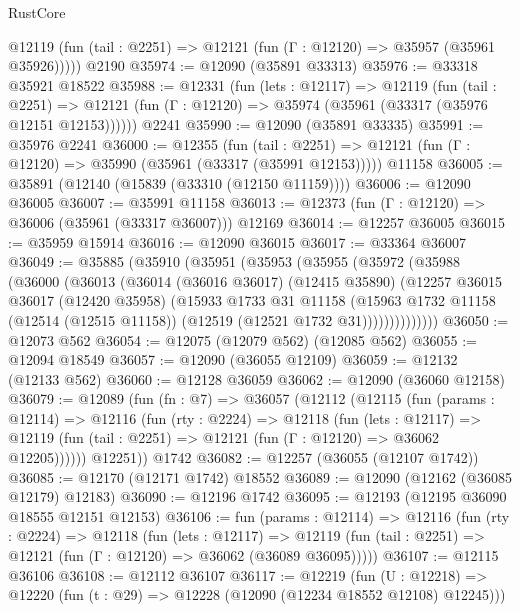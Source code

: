 \begin{lexlean}{RustCore}
\begin{coremodule}
      @12119 (fun (tail : @2251) => @12121 (fun (Γ : @12120) => @35957 (@35961 @35926)))))
    @2190
@35974 := @12090 (@35891 @33313)
@35976 := @33318 @35921 @18522
@35988 := @12331
    (fun (lets : @12117) =>
    @12119
      (fun (tail : @2251) =>
      @12121 (fun (Γ : @12120) => @35974 (@35961 (@33317 (@35976 @12151 @12153))))))
    @2241
@35990 := @12090 (@35891 @33335)
@35991 := @35976 @2241
@36000 := @12355
    (fun (tail : @2251) => @12121 (fun (Γ : @12120) => @35990 (@35961 (@33317 (@35991 @12153)))))
    @11158
@36005 := @35891 (@12140 (@15839 (@33310 (@12150 @11159))))
@36006 := @12090 @36005
@36007 := @35991 @11158
@36013 := @12373 (fun (Γ : @12120) => @36006 (@35961 (@33317 @36007))) @12169
@36014 := @12257 @36005
@36015 := @35959 @15914
@36016 := @12090 @36015
@36017 := @33364 @36007
@36049 := @35885
    (@35910
      (@35951
        (@35953
          (@35955
            (@35972
              (@35988
                (@36000
                  (@36013
                    (@36014
                      (@36016 @36017)
                      (@12415 @35890)
                      (@12257
                        @36015
                        @36017
                        (@12420 @35958)
                        (@15933
                          @1733
                          @31
                          @11158
                          (@15963
                            @1732
                            @11158
                            (@12514 (@12515 @11158))
                            (@12519 (@12521 @1732 @31))))))))))))))
@36050 := @12073 @562
@36054 := @12075 (@12079 @562) (@12085 @562)
@36055 := @12094 @18549
@36057 := @12090 (@36055 @12109)
@36059 := @12132 (@12133 @562)
@36060 := @12128 @36059
@36062 := @12090 (@36060 @12158)
@36079 := @12089
    (fun (fn : @7) =>
    @36057
      (@12112
        (@12115
          (fun (params : @12114) =>
          @12116
            (fun (rty : @2224) =>
            @12118
              (fun (lets : @12117) =>
              @12119 (fun (tail : @2251) => @12121 (fun (Γ : @12120) => @36062 @12205))))))
        @12251))
    @1742
@36082 := @12257 (@36055 (@12107 @1742))
@36085 := @12170 (@12171 @1742) @18552
@36089 := @12090 (@12162 (@36085 @12179) @12183)
@36090 := @12196 @1742
@36095 := @12193 (@12195 @36090 @18555 @12151 @12153)
@36106 := fun (params : @12114) =>
  @12116
    (fun (rty : @2224) =>
    @12118
      (fun (lets : @12117) =>
      @12119 (fun (tail : @2251) => @12121 (fun (Γ : @12120) => @36062 (@36089 @36095)))))
@36107 := @12115 @36106
@36108 := @12112 @36107
@36117 := @12219
    (fun (U : @12218) => @12220 (fun (t : @29) => @12228 (@12090 (@12234 @18552 @12108) @12245)))

\end{coremodule}
\end{lexlean}
